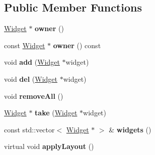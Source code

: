 \subsection*{Public Member Functions}
\begin{DoxyCompactItemize}
\item 
\hypertarget{class_tempest_1_1_layout_a29d7b2b1816bf008ba9ea3eda2725fda}{\hyperlink{class_tempest_1_1_widget}{Widget} $\ast$ {\bfseries owner} ()}\label{class_tempest_1_1_layout_a29d7b2b1816bf008ba9ea3eda2725fda}

\item 
\hypertarget{class_tempest_1_1_layout_a444a047bb69354ec6f76264a9e31e04c}{const \hyperlink{class_tempest_1_1_widget}{Widget} $\ast$ {\bfseries owner} () const }\label{class_tempest_1_1_layout_a444a047bb69354ec6f76264a9e31e04c}

\item 
\hypertarget{class_tempest_1_1_layout_aa3b2af0f1f32ed681e40215e3f48b283}{void {\bfseries add} (\hyperlink{class_tempest_1_1_widget}{Widget} $\ast$widget)}\label{class_tempest_1_1_layout_aa3b2af0f1f32ed681e40215e3f48b283}

\item 
\hypertarget{class_tempest_1_1_layout_a2e30bb81cf8c464e6f1bda11fee2fdf4}{void {\bfseries del} (\hyperlink{class_tempest_1_1_widget}{Widget} $\ast$widget)}\label{class_tempest_1_1_layout_a2e30bb81cf8c464e6f1bda11fee2fdf4}

\item 
\hypertarget{class_tempest_1_1_layout_a3b479d59cef4b31228d0ae0e7f446d07}{void {\bfseries remove\+All} ()}\label{class_tempest_1_1_layout_a3b479d59cef4b31228d0ae0e7f446d07}

\item 
\hypertarget{class_tempest_1_1_layout_a8604c30ec4d0192d7535d0411f89b4fc}{\hyperlink{class_tempest_1_1_widget}{Widget} $\ast$ {\bfseries take} (\hyperlink{class_tempest_1_1_widget}{Widget} $\ast$widget)}\label{class_tempest_1_1_layout_a8604c30ec4d0192d7535d0411f89b4fc}

\item 
\hypertarget{class_tempest_1_1_layout_a4819902514d0731c00f33e09892d0f98}{const std\+::vector$<$ \hyperlink{class_tempest_1_1_widget}{Widget} $\ast$ $>$ \& {\bfseries widgets} ()}\label{class_tempest_1_1_layout_a4819902514d0731c00f33e09892d0f98}

\item 
\hypertarget{class_tempest_1_1_layout_a90f8470da068f33f79bdd8aab15944ad}{virtual void {\bfseries apply\+Layout} ()}\label{class_tempest_1_1_layout_a90f8470da068f33f79bdd8aab15944ad}


\end{DoxyCompactItemize}
